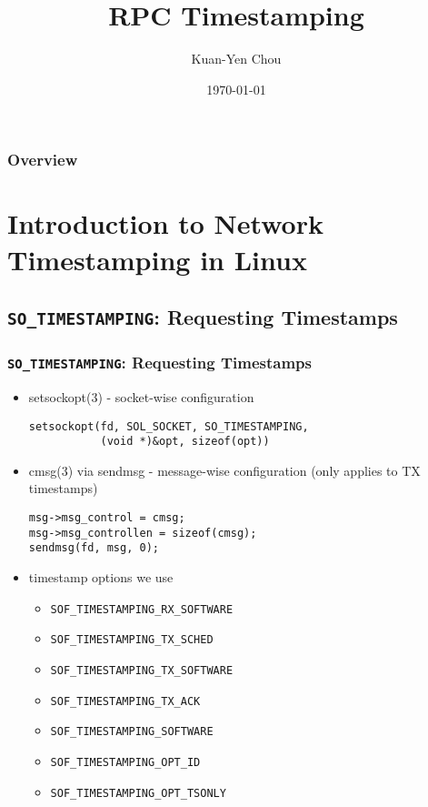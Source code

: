 \documentclass[10pt]{beamer}
\title[RPC Timestamping]{RPC Timestamping}
\author{Kuan-Yen Chou}
\institute[UIUC] {
    University of Illinois at Urbana-Champaign \\ %
    \medskip
    \textit{kychou2@illinois.edu} %
}
\date{\today} %
\begin{document}
\begin{frame}
\titlepage %
\end{frame}

\begin{frame}
\frametitle{Overview} %
\begin{NoHyper}
\tableofcontents
\end{NoHyper}
\end{frame}


\section{Introduction to Network Timestamping in Linux}


\subsection{\texttt{SO\_TIMESTAMPING}: Requesting Timestamps}
\begin{frame}[fragile]
\frametitle{\texttt{SO\_TIMESTAMPING}: Requesting Timestamps}
\begin{itemize}
\item setsockopt(3) - socket-wise configuration
      {\small
      \begin{verbatim}
setsockopt(fd, SOL_SOCKET, SO_TIMESTAMPING,
           (void *)&opt, sizeof(opt))\end{verbatim}
      }
\item cmsg(3) via sendmsg - message-wise configuration (only applies to TX
      timestamps)
      {\small
      \begin{verbatim}
msg->msg_control = cmsg;
msg->msg_controllen = sizeof(cmsg);
sendmsg(fd, msg, 0);\end{verbatim}
      }
\item timestamp options we use
      \begin{itemize}
      \item \small\texttt{SOF\_TIMESTAMPING\_RX\_SOFTWARE}
      \item \small\texttt{SOF\_TIMESTAMPING\_TX\_SCHED}
      \item \small\texttt{SOF\_TIMESTAMPING\_TX\_SOFTWARE}
      \item \small\texttt{SOF\_TIMESTAMPING\_TX\_ACK}
      \item \small\texttt{SOF\_TIMESTAMPING\_SOFTWARE}
      \item \small\texttt{SOF\_TIMESTAMPING\_OPT\_ID}
      \item \small\texttt{SOF\_TIMESTAMPING\_OPT\_TSONLY}
      \end{itemize}
\end{itemize}
\end{frame}
\end{document}
